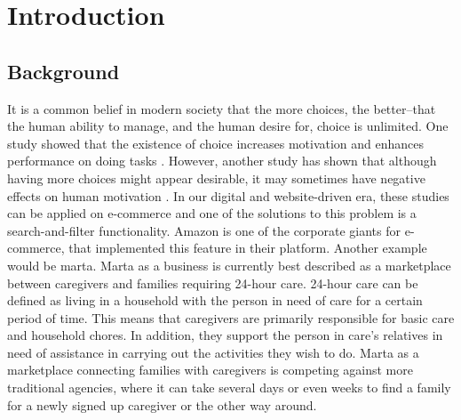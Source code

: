 \newpage
\chapter{Introduction}

\section{Background}
It is a common belief in modern society that the more choices, the better--that the human ability to manage, and the human desire for, choice is unlimited. One study showed that the existence of choice increases motivation and enhances performance on doing tasks \autocite{zuckerman1978importance}. However, another study has shown that although having more choices might appear desirable, it may sometimes have negative effects on human motivation \autocite{iyengar2000choice}. In our digital and website-driven era, these studies can be applied on e-commerce and one of the solutions to this problem is a search-and-filter functionality. Amazon is one of the corporate giants for e-commerce, that implemented this feature in their platform. Another example would be marta.
Marta as a business is currently best described as a marketplace between caregivers and families requiring 24-hour care. 24-hour care can be defined as living in a household with the person in need of care for a certain period of time. This means that caregivers are primarily responsible for basic care and household chores. In addition, they support the person in care's relatives in need of assistance in carrying out the activities they wish to do. Marta as a marketplace connecting families with caregivers is competing against more traditional agencies, where it can take several days or even weeks to find a family for a newly signed up caregiver or the other way around.

